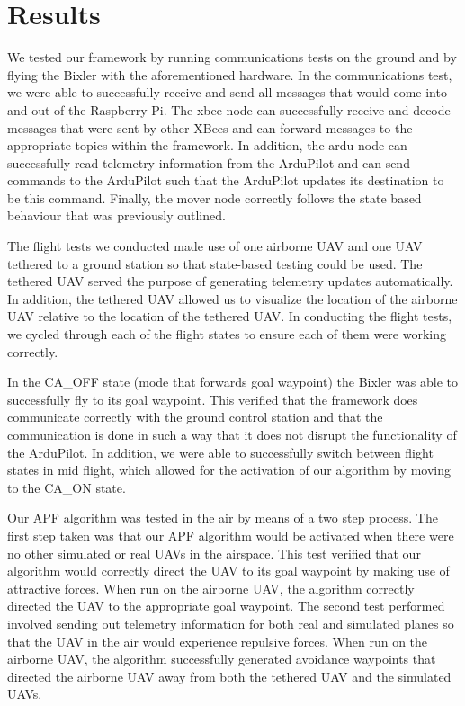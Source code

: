 \documentclass[conference]{IEEEtran}
\begin{document}
\section{Results}
\label{sec:results}

We tested our framework by running communications tests on the ground and by flying the Bixler with the aforementioned hardware. In the communications test, we were able to successfully receive and send all messages that would come into and out of the Raspberry Pi.  The xbee node can successfully receive and decode messages that were sent by other XBees and can forward messages to the appropriate topics within the framework.  In addition, the ardu node can successfully read telemetry information from the ArduPilot and can send commands to the ArduPilot such that the ArduPilot updates its destination to be this command.  Finally, the mover node correctly follows the state based behaviour that was previously outlined.  

The flight tests we conducted made use of one airborne UAV and one UAV tethered to a ground station so that state-based testing could be used.  The tethered UAV served the purpose of generating telemetry updates automatically. In addition, the tethered UAV allowed us to visualize the location of the airborne UAV relative to the location of the tethered UAV. In conducting the flight tests, we cycled through each of the flight states to ensure each of them were working correctly.

 In the CA\_OFF state (mode that forwards goal waypoint) the Bixler was able to successfully fly to its goal waypoint.  This verified that the framework does communicate correctly with the ground control station and that the communication is done in such a way that it does not disrupt the functionality of the ArduPilot. In addition, we were able to successfully switch between flight states in mid flight, which allowed for the activation of our algorithm by moving to the CA\_ON state. 

Our APF algorithm was tested in the air by means of a two step process.  The first step taken was that our APF algorithm would be activated when there were no other simulated or real UAVs in the airspace.  This test verified that our algorithm would correctly direct the UAV to its goal waypoint by making use of attractive forces.  When run on the airborne UAV, the algorithm correctly directed the UAV to the appropriate goal waypoint.  The second test performed involved sending out telemetry information for both real and simulated planes so that the UAV in the air would experience repulsive forces.  When run on the airborne UAV, the algorithm successfully generated avoidance waypoints that directed the airborne UAV away from both the tethered UAV and the simulated UAVs. 
\end{document}
